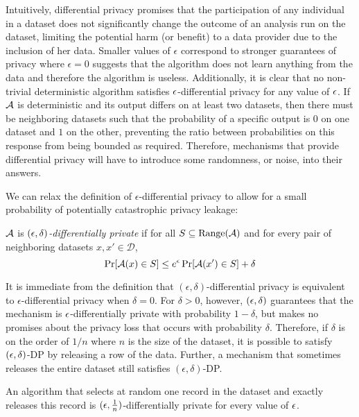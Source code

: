 Intuitively, differential privacy promises that the participation of any individual in a dataset does not significantly change the outcome of an analysis run on the dataset, limiting the potential harm (or benefit) to a data provider due to the inclusion of her data. Smaller values of $\epsilon$ correspond to stronger guarantees of privacy where $\epsilon = 0$ suggests that the algorithm does not learn anything from the data and therefore the algorithm is useless. Additionally, it is clear that no non-trivial deterministic algorithm satisfies $\epsilon$-differential privacy for any value of $\epsilon$. If $\mathcal{A}$ is deterministic and its output differs on at least two datasets, then there must be neighboring datasets such that the probability of a specific output is $0$ on one dataset and $1$ on the other, preventing the ratio between probabilities on this response from being bounded as required. Therefore, mechanisms that provide differential privacy will have to introduce some randomness, or noise, into their answers.

We can relax the definition of $\epsilon$-differential privacy to allow for a small probability of potentially catastrophic privacy leakage:

\begin{definition}
$\mathcal{A}$ is \emph{$(\epsilon, \delta)$-differentially private} if for all $S \subseteq \text{Range}(\mathcal{A})$ and for every pair of neighboring datasets $x, x' \in \mathcal{D}$,
\begin{equation*}
\Pr[\mathcal{A}(x) \in S] \leq e^{\epsilon} \Pr[\mathcal{A}(x') \in S] + \delta
\end{equation*}
\end{definition}

It is immediate from the definition that $(\epsilon, \delta)$-differential privacy is equivalent to $\epsilon$-differential privacy  when $\delta = 0$. For $\delta > 0$,  however, $(\epsilon, \delta)$ guarantees that the mechanism is $\epsilon$-differentially private with probability $1-\delta$, but makes no promises about the privacy loss that occurs with probability $\delta$. Therefore, if $\delta$ is on the order of $1/n$ where $n$ is the size of the dataset, it is possible to satisfy $(\epsilon, \delta)$-DP by releasing a row of the data. Further, a mechanism that sometimes releases the entire dataset still satisfies $(\epsilon, \delta)$-DP.

\begin{example}
	\label{ex:bad_delta1}
	An algorithm that selects at random one record in the dataset and exactly releases this record is $(\epsilon, \frac{1}{n})$-differentially private for every value of $\epsilon$.
\end{example}

